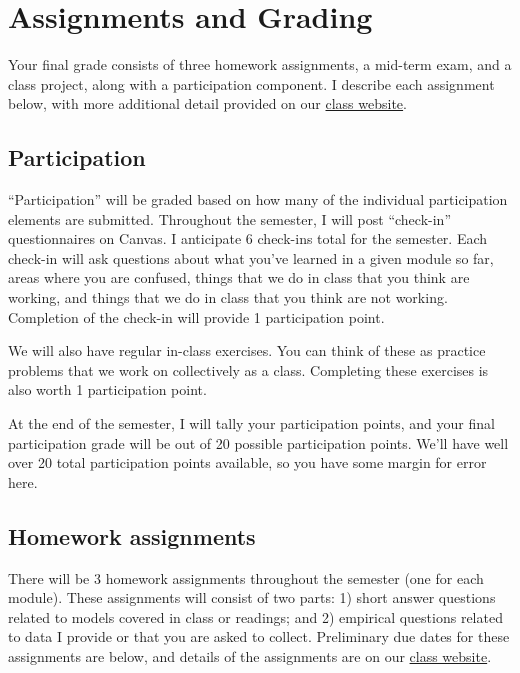 \documentclass[11pt,]{article}
\begin{document}
\hypertarget{assignments-and-grading}{%
\section{Assignments and Grading}\label{assignments-and-grading}}

Your final grade consists of three homework assignments, a mid-term
exam, and a class project, along with a participation component. I
describe each assignment below, with more additional detail provided on
our \href{https://econ372s23.classes.ianmccarthyecon.com/}{class
website}.

\hypertarget{participation}{%
\subsection{Participation}\label{participation}}

``Participation'' will be graded based on how many of the individual
participation elements are submitted. Throughout the semester, I will
post ``check-in'' questionnaires on Canvas. I anticipate 6 check-ins
total for the semester. Each check-in will ask questions about what
you've learned in a given module so far, areas where you are confused,
things that we do in class that you think are working, and things that
we do in class that you think are not working. Completion of the
check-in will provide 1 participation point.

We will also have regular in-class exercises. You can think of these as
practice problems that we work on collectively as a class. Completing
these exercises is also worth 1 participation point.

At the end of the semester, I will tally your participation points, and
your final participation grade will be out of 20 possible participation
points. We'll have well over 20 total participation points available, so
you have some margin for error here.

\hypertarget{homework-assignments}{%
\subsection{Homework assignments}\label{homework-assignments}}

There will be 3 homework assignments throughout the semester (one for
each module). These assignments will consist of two parts: 1) short
answer questions related to models covered in class or readings; and 2)
empirical questions related to data I provide or that you are asked to
collect. Preliminary due dates for these assignments are below, and
details of the assignments are on our
\href{https://econ372s23.classes.ianmccarthyecon.com/}{class website}.
\end{document}
